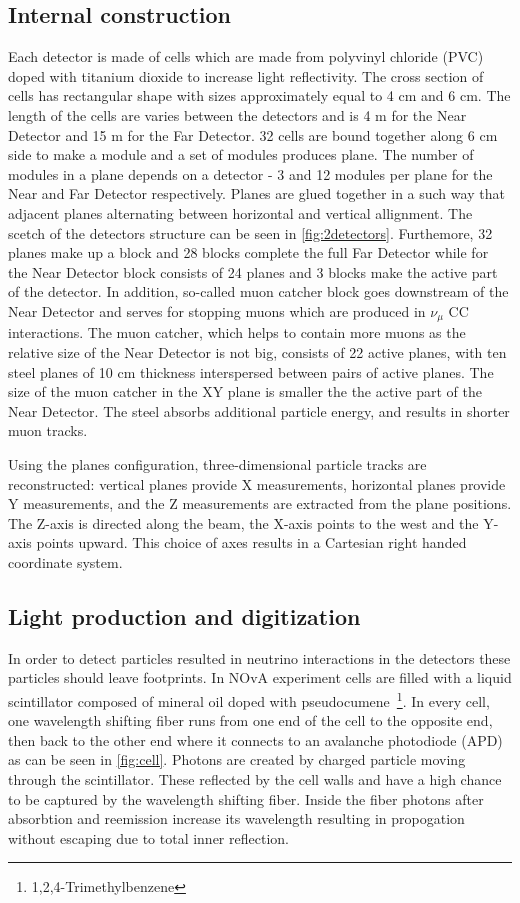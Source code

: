 \subsection{Internal construction}
Each detector is made of cells which are made from polyvinyl chloride (PVC) doped with titanium 
dioxide to increase light reflectivity. The cross section of cells has rectangular shape with sizes
approximately equal to 4 cm and 6 cm. The length of the cells are varies between the detectors and 
is 4 m for the Near Detector and 15 m for the Far Detector. 32 cells are bound together along
6 cm side to make a module and a set of modules produces plane. The number of modules in a plane
depends on a detector - 3 and 12 modules per plane for the Near and Far Detector respectively. Planes
are glued together in a such way that adjacent planes alternating between horizontal and vertical
allignment. The scetch of the detectors structure can be seen in \ref{fig:2detectors}. Furthemore, 32 planes 
make up a block and 28 blocks complete the full Far Detector while for the Near Detector block consists
of 24 planes and 3 blocks make the active part of the detector. In addition, so-called muon catcher
block goes downstream of the Near Detector and serves for stopping muons which are produced in $\nu_\mu$ 
CC interactions. The muon catcher, which helps to contain more muons as the relative size of the Near 
Detector is not big, consists of 22 active planes, with ten steel planes of 10 cm thickness interspersed 
between pairs of active planes. The size of the muon catcher in the XY plane is smaller the the active 
part of the Near Detector. The steel absorbs additional particle energy, and results in shorter muon tracks.

Using the planes configuration, three-dimensional particle tracks are reconstructed: vertical planes
provide X measurements, horizontal planes provide Y measurements, and the Z measurements are extracted from
the plane positions. The Z-axis is directed along the beam, the X-axis points to the west and the Y-axis points
upward. This choice of axes results in a Cartesian right handed coordinate system.

\subsection{Light production and digitization}
In order to detect particles resulted in neutrino interactions in the detectors these particles 
should leave footprints. In NOvA experiment cells are filled with a liquid scintillator composed 
of mineral oil doped with pseudocumene~\footnote{1,2,4-Trimethylbenzene}. In every cell, one wavelength 
shifting fiber runs from one end of the cell to the opposite end, then back to the other end where 
it connects to an avalanche photodiode (APD) as can be seen in \ref{fig:cell}. Photons are created by charged 
particle moving through the scintillator. These reflected by the cell walls and have a high chance 
to be captured by the wavelength shifting fiber. Inside the fiber photons after absorbtion and
reemission increase its wavelength resulting in propogation without escaping due to total inner
reflection. 

